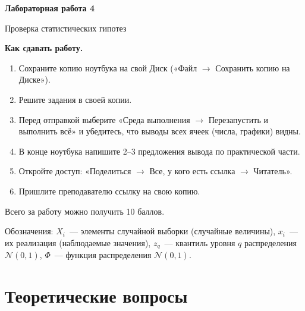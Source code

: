 \documentclass[a4paper,12pt]{article}
\begin{document}
\begin{center}
  {\Large\bfseries Лабораторная работа 4\par}
  {\large Проверка статистических гипотез\par}
\end{center}

\textbf{Как сдавать работу.}
\begin{enumerate}[itemsep=0.3em]
  \item Сохраните копию ноутбука на свой Диск («Файл $\to$ Сохранить копию на Диске»).
  \item Решите задания в своей копии.
  \item Перед отправкой выберите «Среда выполнения $\to$ Перезапустить и выполнить всё» и убедитесь, что выводы всех ячеек (числа, графики) видны.
  \item В конце ноутбука напишите 2--3 предложения вывода по практической части.
  \item Откройте доступ: «Поделиться $\to$ Все, у кого есть ссылка $\to$ Читатель».
  \item Пришлите преподавателю ссылку на свою копию.
\end{enumerate}

Всего за работу можно получить 10 баллов.

Обозначения: $X_i$~--- элементы случайной выборки (случайные величины), $x_i$~--- их реализация (наблюдаемые значения), $z_q$~--- квантиль уровня $q$ распределения $\mathcal{N}(0,1)$, $\Phi$~--- функция распределения $\mathcal{N}(0,1)$.

\section*{Теоретические вопросы}
\end{document}
